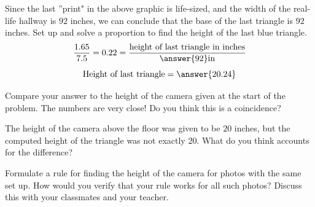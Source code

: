 \documentclass{ximera}
\begin{document}
\begin{exploration}
    Since the last ''print" in the above graphic is life-sized, and the width of the real-life hallway is $92$ inches, we can conclude that the base of the last triangle is $92$ inches. 
    Set up and solve a proportion to find the height of the last blue triangle.  
    $$\frac{1.65}{7.5}=0.22=\frac{\text{height of last triangle in inches}}{\answer{92}\text{in}}$$
    $$\text{Height of last triangle}=\answer{20.24}$$

    Compare your answer to the height of the camera given at the start of the problem.  The numbers are very close!  Do you think this is a coincidence?  

    The height of the camera above the floor was given to be $20$ inches, but the computed height of the triangle was not exactly $20$.  What do you think accounts for the difference?

    Formulate a rule for finding the height of the camera for photos with the same set up.  How would you verify that your rule works for all such photos?  Discuss this with your classmates and your teacher.
\end{exploration}
\end{document}
